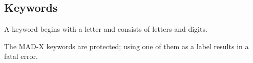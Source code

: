 

\subsection{Keywords}

A keyword begins with a letter and consists of letters and digits. 

The MAD-X keywords are protected; using one of them as a label results
in a fatal error.   


